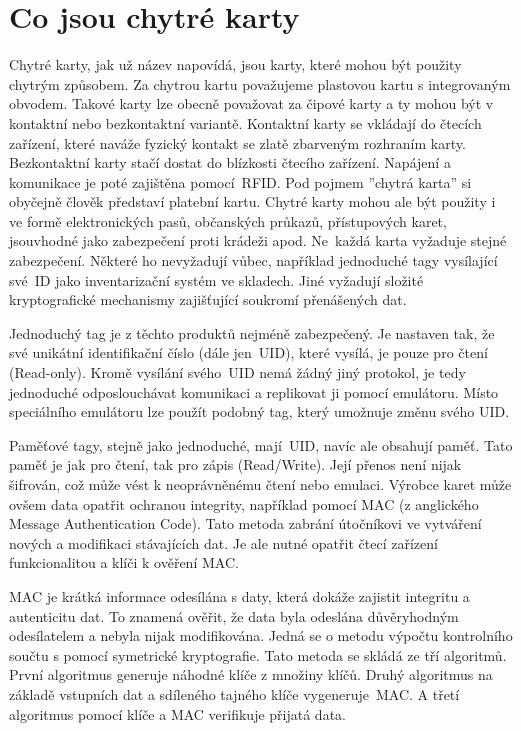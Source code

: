 \section{Co jsou chytré karty}
Chytré karty, jak už název napovídá, jsou karty, které mohou být použity chytrým způsobem. Za chytrou kartu považujeme plastovou kartu s integrovaným obvodem. Takové karty lze obecně považovat za čipové karty a ty mohou být v kontaktní nebo bezkontaktní variantě. Kontaktní karty se vkládají do čtecích zařízení, které naváže fyzický kontakt se zlatě zbarveným rozhraním karty. Bezkontaktní karty stačí dostat do blízkosti čtecího zařízení. Napájení a komunikace je poté zajištěna pomocí~RFID. Pod pojmem ''chytrá karta'' si obyčejně člověk představí platební kartu. Chytré karty mohou ale být použity i ve formě elektronických pasů, občanských průkazů, přístupových karet, jsouvhodné jako zabezpečení proti krádeži apod. Ne~každá karta vyžaduje stejné zabezpečení. Některé ho nevyžadují vůbec, například jednoduché tagy vysílající své~ID jako inventarizační systém ve skladech. Jiné vyžadují složité kryptografické mechanismy zajišťující soukromí přenášených dat. 
\par
Jednoduchý tag je z těchto produktů nejméně zabezpečený. Je nastaven tak, že své unikátní identifikační číslo (dále jen~UID), které vysílá, je pouze pro čtení {(Read-only)}. Kromě vysílání svého~UID nemá žádný jiný protokol, je tedy jednoduché odposlouchávat komunikaci a replikovat ji pomocí emulátoru. Místo speciálního emulátoru lze použít podobný tag, který umožnuje změnu svého UID.
\par
Paměťové tagy, stejně jako jednoduché, mají~UID, navíc ale obsahují paměť. Tato paměť je jak pro čtení, tak pro zápis {(Read/Write)}. Její přenos není nijak šifrován, což může vést k neoprávněnému čtení nebo emulaci. Výrobce karet může ovšem data opatřit ochranou integrity, například pomocí MAC (z anglického Message Authentication Code). Tato metoda zabrání útočníkovi ve vytváření nových a modifikaci stávajících dat. Je ale nutné opatřit čtecí zařízení funkcionalitou a klíči k ověření MAC\cite{Mifare_Classic_story}.
\par
MAC je krátká informace odesílána s daty, která dokáže zajistit integritu a autenticitu dat. To znamená ověřit, že data byla odeslána důvěryhodným odesílatelem a nebyla nijak modifikována. Jedná se o metodu výpočtu kontrolního součtu s pomocí symetrické kryptografie. Tato metoda se skládá ze tří algoritmů. První algoritmus generuje náhodné klíče z množiny klíčů. Druhý algoritmus na základě vstupních dat a sdíleného tajného klíče vygeneruje~MAC. A třetí algoritmus pomocí klíče a MAC verifikuje přijatá data\cite{Foundations_Of_Cryptography}.
